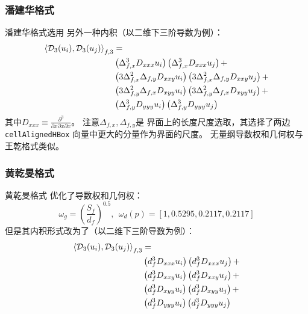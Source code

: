 \documentclass[UTF8,zihao=5]{ctexart} %
\newcommand*{\pd}[2]{\frac{\partial #1}{\partial #2}}
\newcommand*{\inc}[0]{{\Delta}}
\begin{document}
\subsubsection{潘建华格式}

潘建华格式\cite{jianhua2018high}选用
另外一种内积（以二维下三阶导数为例）：
$$
    \begin{aligned}
        \inner{\D_3(u_i),\D_3(u_j)}_{f,3}
         & = \\
         &
        \left(\inc_{f,x}^3 D_{xxx}u_i\right)
        \left(\inc_{f,x}^3 D_{xxx}u_j\right)
        +    \\
         &
        \left(3\inc_{f,x}^2\inc_{f,y} D_{xxy}u_i\right)
        \left(3\inc_{f,x}^2\inc_{f,y} D_{xxy}u_j\right)
        +    \\
         &
        \left(3\inc_{f,y}^2\inc_{f,x} D_{xyy}u_i\right)
        \left(3\inc_{f,y}^2\inc_{f,x} D_{xyy}u_j\right)
        +    \\
         &
        \left(\inc_{f,y}^3 D_{yyy}u_i\right)
        \left(\inc_{f,y}^3 D_{yyy}u_j\right)
    \end{aligned}
$$
其中$D_{xxx}\equiv \pd{^3}{x\partial x\partial x}$。
注意$\inc_{f,x}, \inc_{f,y}$是
界面上的长度尺度选取，其选择了两边\verb|cellAlignedHBox|
向量中更大的分量作为界面的尺度。
无量纲导数权和几何权与王乾格式类似。

\subsubsection{黄乾旻格式}

黄乾旻格式\cite{huang2022high}
优化了导数权和几何权：
$$
    \omega_g = \left(\frac{S_f}{d_f}\right)^{0.5},
    \ \ \omega_d(p) =  [1, 0.5295, 0.2117, 0.2117]
$$
但是其内积形式改为了（以二维下三阶导数为例）：
$$
    \begin{aligned}
        \left\langle\mathcal{D}_3(u_i),\mathcal{D}_3(u_j)\right\rangle_{f,3}
         & = \\
         &
        \left(d_f^3 D_{xxx}u_i\right)
        \left(d_f^3 D_{xxx}u_j\right)
        +    \\
         &
        \left(d_f^3 D_{xxy}u_i\right)
        \left(d_f^3 D_{xxy}u_j\right)
        +    \\
         &
        \left(d_f^3 D_{xyy}u_i\right)
        \left(d_f^3 D_{xyy}u_j\right)
        +    \\
         &
        \left(d_f^3 D_{yyy}u_i\right)
        \left(d_f^3 D_{yyy}u_j\right)
    \end{aligned}
$$
\end{document}
